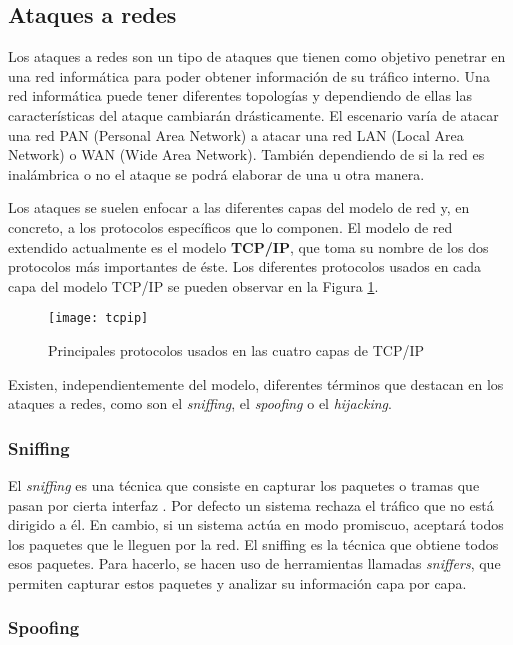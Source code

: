 \subsection{Ataques a redes}

Los ataques a redes son un tipo de ataques que tienen como objetivo penetrar en una red informática para poder obtener información de su tráfico interno. Una red informática puede tener diferentes topologías y dependiendo de ellas las características del ataque cambiarán drásticamente. El escenario varía de atacar una red PAN (Personal Area Network) a atacar una red LAN (Local Area Network) o WAN (Wide Area Network). También dependiendo de si la red es inalámbrica o no el ataque se podrá elaborar de una u otra manera.

Los ataques se suelen enfocar a las diferentes capas del modelo de red y, en concreto, a los protocolos específicos que lo componen. El modelo de red extendido actualmente es el modelo \textbf{TCP/IP}, que toma su nombre de los dos protocolos más importantes de éste. Los diferentes protocolos usados en cada capa del modelo TCP/IP se pueden observar en la Figura \ref{fig:tcpip}.

\begin{figure}[H]
	\centering
	\texttt{[image: tcpip]}
	\caption{Principales protocolos usados en las cuatro capas de TCP/IP}
	\label{fig:tcpip}
\end{figure}

Existen, independientemente del modelo, diferentes términos que destacan en los ataques a redes, como son el \textit{sniffing}, el \textit{spoofing} o el \textit{hijacking}.

\subsubsection{Sniffing}

El \emph{sniffing} es una técnica que consiste en capturar los paquetes o tramas que pasan por cierta interfaz \cite{ataque-en-redes-ip}. Por defecto un sistema rechaza el tráfico que no está dirigido a él. En cambio, si un sistema actúa en modo promiscuo, aceptará todos los paquetes que le lleguen por la red. El sniffing es la técnica que obtiene todos esos paquetes. Para hacerlo, se hacen uso de herramientas llamadas \textit{sniffers}, que permiten capturar estos paquetes y analizar su información capa por capa.

\subsubsection{Spoofing}

